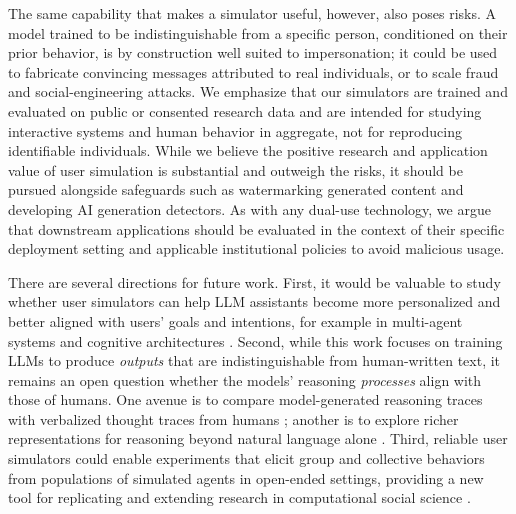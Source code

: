 \documentclass[11pt]{article}
\begin{document}
The same capability that makes a simulator useful, however, also poses risks. A model trained to be indistinguishable from a specific person, conditioned on their prior behavior, is by construction well suited to impersonation; it could be used to fabricate convincing messages attributed to real individuals, or to scale fraud and social-engineering attacks. We emphasize that our simulators are trained and evaluated on public or consented research data and are intended for studying interactive systems and human behavior in aggregate, not for reproducing identifiable individuals. While we believe the positive research and application value of user simulation is substantial and outweigh the risks, it should be pursued alongside safeguards such as watermarking generated content and developing AI generation detectors. As with any dual-use technology, we argue that downstream applications should be evaluated in the context of their specific deployment setting and applicable institutional policies to avoid malicious usage. 




There are several directions for future work. First, it would be valuable to study whether user simulators can help LLM assistants become more personalized and better aligned with users' goals and intentions, for example in multi-agent systems \citep{guo2024large, tomavsev2026intelligent} and cognitive architectures \citep{sumers2023cognitive, liu2026cognitive}. Second, while this work focuses on training LLMs to produce \textit{outputs} that are indistinguishable from human-written text, it remains an open question whether the models' reasoning \textit{processes} align with those of humans. One avenue is to compare model-generated reasoning traces with verbalized thought traces from humans \citep{wurgaft2025scaling, kargupta2025cognitive}; another is to explore richer representations for reasoning beyond natural language alone \citep{jha2025modeling, zhang2025code, li2026simulating}. Third, reliable user simulators could enable experiments that elicit group and collective behaviors from populations of simulated agents in open-ended settings, providing a new tool for replicating and extending research in computational social science \citep{lazer2009computational, ziems2024can}.
\end{document}
